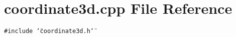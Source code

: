 \section{coordinate3d.cpp File Reference}
\label{coordinate3d_8cpp}
{\tt \#include \char`\"{}coordinate3d.h\char`\"{}}\par
